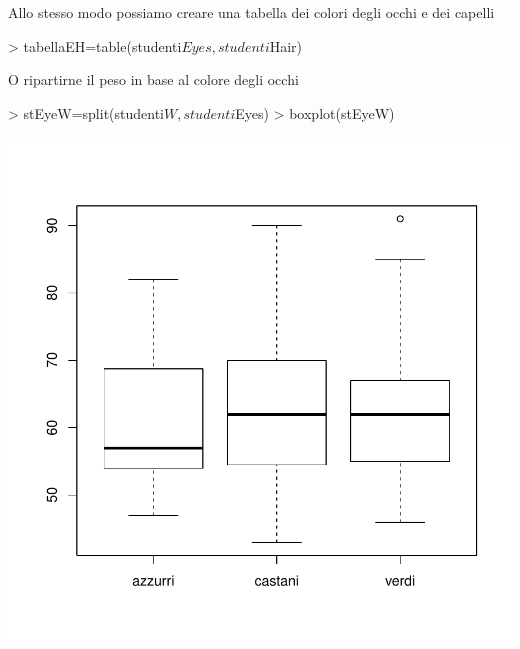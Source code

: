 \documentclass[onecolumn,12pt]{book}
\begin{document}
Allo stesso modo possiamo creare una tabella dei colori degli occhi e dei capelli
\begin{Schunk}
\begin{Sinput}
> tabellaEH=table(studenti$Eyes,studenti$Hair)
\end{Sinput}
\end{Schunk}
O ripartirne il peso in base al colore degli occhi
\begin{Schunk}
\begin{Sinput}
> stEyeW=split(studenti$W,studenti$Eyes)
> boxplot(stEyeW)
\end{Sinput}
\end{Schunk}
\includegraphics{RbookParte2-074}
\end{document}
